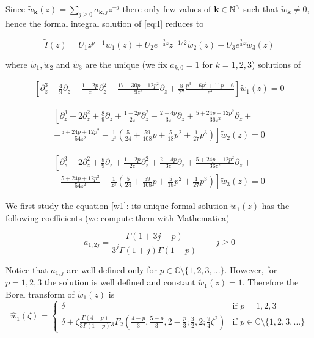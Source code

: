 \documentclass{article}
\newcommand{\C}{\mathbb{C}}
\begin{document}
Since $\tilde{w}_{\mathbf{k}}(z)=\sum_{j\geq 0}a_{\mathbf{k},j}z^{-j}$ there only  few values of $\mathbf{k}\in\mathbb N^3$ such that $\tilde{w}_{\mathbf{k}}\neq 0$, hence the formal integral solution of \eqref{eq:I} reduces to 

\begin{equation}
\tilde{I}(z)=U_1z^{p-1}\tilde{w}_1(z)+U_2e^{-\tfrac{2}{3}z}z^{-1/2}\tilde{w}_2(z)+U_3e^{\tfrac{2}{3}z}\tilde{w}_3(z)
\end{equation}

where $\tilde{w}_1, \tilde{w}_2$ and $\tilde{w}_3$ are the unique (we fix $a_{k,0}=1$ for $k=1,2,3$) solutions of 

\begin{multline}\label{w1}
\left[\partial_z^3-\frac{4}{9}\partial_z-\frac{1-2p}{z}\partial_z^2+\frac{17-30p+12p^2}{9z^2}\partial_z+\frac{8}{27}\frac{p^3-6p^2+11p-6}{z^3}\right]\tilde{w}_1(z)=0
\end{multline}


\begin{multline}\label{w2}
\left[\partial_z^3-2\partial_z^2+\frac{8}{9}\partial_z+\frac{1-2p}{2z}\partial_z^2-\frac{2-4p}{3z}\partial_z+\frac{5+24p+12p^2}{36z^2}\partial_z+\right.\\
\left.-\frac{5+24p+12p^2}{54z^2}-\frac{1}{z^3}\left(\frac{5}{24}+\frac{59}{108}p+\frac{5}{18}p^2+\frac{1}{27}p^3\right)\right]\tilde{w}_2(z)=0
\end{multline}

\begin{multline}\label{w3}
\left[\partial_z^3+2\partial_z^2+\frac{8}{9}\partial_z+\frac{1-2p}{2z}\partial_z^2+\frac{2-4p}{3z}\partial_z+\frac{5+24p+12p^2}{36z^2}\partial_z+\right.\\
\left.+\frac{5+24p+12p^2}{54z^2}-\frac{1}{z^3}\left(\frac{5}{24}+\frac{59}{108}p+\frac{5}{18}p^2+\frac{1}{27}p^3\right)\right]\tilde{w}_3(z)=0
\end{multline}

We first study the equation \eqref{w1}: its unique formal solution $\tilde{w}_1(z)$ has the following coefficients (we compute them with Mathematica)

\begin{equation}
a_{1,2j}=\frac{\Gamma\left(1+3j-p\right)}{3^j\Gamma(1+j)\Gamma(1-p)} \,\qquad j\geq 0
\end{equation}

Notice that $a_{1,j}$ are well defined only for $p\in\C\setminus\lbrace 1,2,3,...\rbrace$. However, for $p=1,2,3$ the solution is well defined and constant $\tilde{w}_1(z)=1$. Therefore the Borel transform of $\tilde{w}_1(z)$ is 
\begin{equation}
\hat{w}_1(\zeta)=\begin{cases}
\delta & \text{if } p=1,2,3 \\
\delta+\zeta\frac{\Gamma(4-p)}{3\Gamma(1-p)}{}_3F_2\left(\frac{4-p}{3},\frac{5-p}{3},2-\frac{p}{3};\frac{3}{2},2;\frac{9}{4}\zeta^2\right) & \text{if } p\in\C\setminus\lbrace 1,2,3,...\rbrace
\end{cases}
\end{equation}
\end{document}
